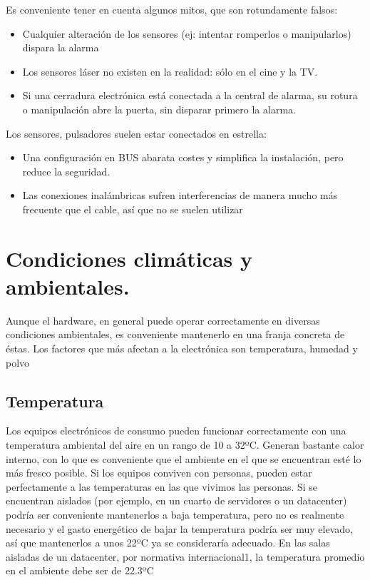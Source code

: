 \documentclass{article}
\begin{document}
Es conveniente tener en cuenta algunos mitos, que son rotundamente falsos:
\begin{itemize}
\item Cualquier alteración de los sensores (ej: intentar romperlos o manipularlos) dispara la alarma
\item Los sensores láser no existen en la realidad: sólo en el cine y la TV.
\item Si una cerradura electrónica está conectada a la central de alarma, su rotura o manipulación abre la puerta, sin disparar primero la alarma.
\end{itemize}

Los sensores, pulsadores suelen estar conectados en estrella:
\begin{itemize}
\item Una configuración en BUS abarata costes y simplifica la instalación, pero reduce la seguridad.
\item Las conexiones inalámbricas sufren interferencias de manera mucho más frecuente que el cable, así que no se suelen utilizar
\end{itemize}

\section{Condiciones climáticas y ambientales.}
\label{sec:orgceaf9ee}
Aunque el hardware, en general puede operar correctamente en diversas condiciones ambientales, es conveniente mantenerlo en una franja concreta de éstas.
Los factores que más afectan a la electrónica son temperatura, humedad y polvo

\subsection{Temperatura}
\label{sec:org0f09549}
Los equipos electrónicos  de consumo pueden funcionar correctamente con una temperatura ambiental del aire en un rango de 10 a 32ºC.
Generan bastante calor interno, con lo que es conveniente que el ambiente en el que se encuentran esté lo más fresco posible.
Si los equipos conviven con personas, pueden estar perfectamente a las temperaturas en las que vivimos las personas.
Si se encuentran aislados (por ejemplo, en un cuarto de servidores o un datacenter) podría ser conveniente mantenerlos a baja temperatura, pero no es realmente necesario y el gasto energético de bajar la temperatura podría ser muy elevado, así que mantenerlos a unos 22ºC ya se consideraría adecuado. En las salas aisladas de un datacenter, por normativa internacional1, la temperatura promedio en el ambiente debe ser de 22.3ºC
\end{document}
